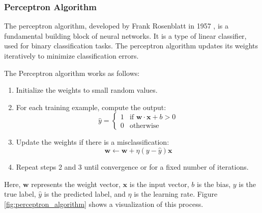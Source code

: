 \documentclass[english,11pt,a4paper,titlepage]{article}
\begin{document}
	\subsubsection*{Perceptron Algorithm}
	The perceptron algorithm, developed by Frank Rosenblatt in 1957 \cite{rosenblattPerceptronProbabilisticModel1958}, is a fundamental building block of neural networks. It is a type of linear classifier, used for binary classification tasks. The perceptron algorithm updates its weights iteratively to minimize classification errors.

	The Perceptron algorithm works as follows:
	\begin{enumerate}
		\item Initialize the weights to small random values.
		\item For each training example, compute the output:
		\begin{equation*}
			\hat{y} = \begin{cases}
				1 & \text{if } \mathbf{w} \cdot \mathbf{x} + b > 0 \\
				0 & \text{otherwise}
			\end{cases}
		\end{equation*}
		\item Update the weights if there is a misclassification:
		\begin{equation*}
			\mathbf{w} \leftarrow \mathbf{w} + \eta (y - \hat{y}) \mathbf{x}
		\end{equation*}
		\item Repeat steps 2 and 3 until convergence or for a fixed number of iterations.
	\end{enumerate}
	
	Here, \( \mathbf{w} \) represents the weight vector, \( \mathbf{x} \) is the input vector, \( b \) is the bias, \( y \) is the true label, \( \hat{y} \) is the predicted label, and \( \eta \) is the learning rate. Figure \ref{fig:perceptron_algorithm} shows a visualization of this process.
	
\end{document}

